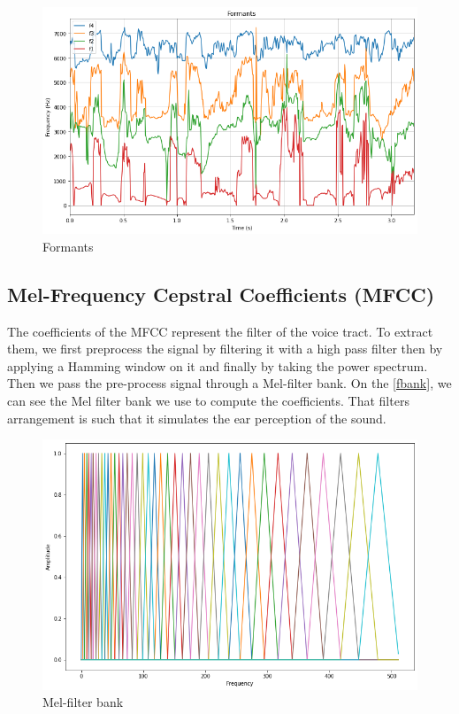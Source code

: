 \documentclass[]{article}
\begin{document}
\begin{figure}[H]
    \centering
    \caption{\label{formants}Formants}
    \includegraphics[scale=0.5]{images/formants.png}
\end{figure}

\subsection{Mel-Frequency Cepstral Coefficients (MFCC)}
The coefficients of the MFCC represent the filter of the voice tract. To extract them, we first preprocess the signal by filtering it with a
high pass filter then by applying a Hamming window on it and finally by taking the power spectrum. Then we pass the pre-process signal through
a Mel-filter bank. On the \autoref{fbank}, we can see the Mel filter bank we use to compute the coefficients.
That filters arrangement is such that it simulates the ear perception of the sound.

\begin{figure}[H]
    \centering
    \caption{\label{fbank}Mel-filter bank}
    \includegraphics[scale=0.5]{images/fbank.png}
\end{figure}
\end{document}

